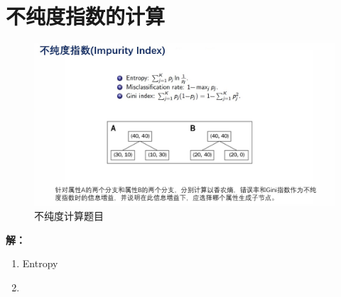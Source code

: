 \documentclass[a4paper,UTF8,openany]{book}
\begin{document}
\section{不纯度指数的计算}
\begin{figure}[ht]

	\centering
	\includegraphics[width=\textwidth]{pic/impure.jpg}
	\caption{不纯度计算题目}
	\label{fig:label}
\end{figure}
\textbf{解：}
\begin{enumerate}
	\item Entropy
	\item 
\end{enumerate}
\end{document}
